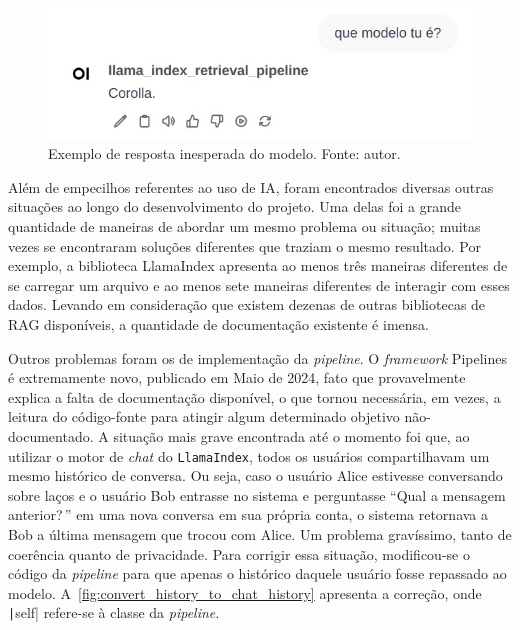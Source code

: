 \documentclass[journal]{IEEEtran}
\begin{document}
\begin{figure}[h]
    \centering
    \includegraphics[width=\columnwidth]{media/corolla.png}
    \caption{%
    Exemplo de resposta inesperada do modelo. Fonte: autor.\label{fig:corolla}}
\end{figure}

Além de empecilhos referentes ao uso de IA, foram encontrados diversas outras situações ao longo do desenvolvimento do projeto.
Uma delas foi a grande quantidade de maneiras de abordar um mesmo problema ou situação; muitas vezes se encontraram soluções diferentes que traziam o mesmo resultado.
Por exemplo, a biblioteca LlamaIndex apresenta ao menos três maneiras diferentes de se carregar um arquivo e ao menos sete maneiras diferentes de interagir com esses dados.
Levando em consideração que existem dezenas de outras bibliotecas de RAG disponíveis, a quantidade de documentação existente é imensa.

Outros problemas foram os de implementação da \textit{pipeline}.
O \textit{framework} Pipelines é extremamente novo, publicado em Maio de 2024, fato que provavelmente explica a falta de documentação disponível, o que tornou necessária, em vezes, a leitura do código-fonte para atingir algum determinado objetivo não-documentado.
A situação mais grave encontrada até o momento foi que, ao utilizar o motor de \textit{chat} do \texttt{LlamaIndex}, todos os usuários compartilhavam um mesmo histórico de conversa.
Ou seja, caso o usuário Alice estivesse conversando sobre laços e o usuário Bob entrasse no sistema e perguntasse ``Qual a mensagem anterior?\,'' em uma nova conversa em sua própria conta, o sistema retornava a Bob a última mensagem que trocou com Alice.
Um problema gravíssimo, tanto de coerência quanto de privacidade.
Para corrigir essa situação, modificou-se o código da \textit{pipeline} para que apenas o histórico daquele usuário fosse repassado ao modelo.
A~\cref{fig:convert_history_to_chat_history} apresenta a correção, onde \texttt|self| refere-se à classe da \textit{pipeline}.
\end{document}
